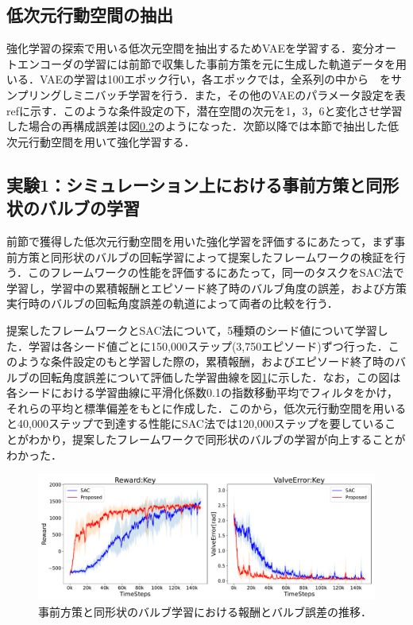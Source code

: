 \documentclass[dvipdfmx]{ampbt_nomag}
\begin{document}
\subsection{低次元行動空間の抽出}
強化学習の探索で用いる低次元空間を抽出するためVAEを学習する．変分オートエンコーダの学習には前節で収集した事前方策を元に生成した軌道データを用いる．VAEの学習は100エポック行い，各エポックでは，全系列の中から　をサンプリングしミニバッチ学習を行う．また，その他のVAEのパラメータ設定を表ref{}に示す．このような条件設定の下，潜在空間の次元を1，3，6と変化させ学習した場合の再構成誤差は図\ref{}のようになった．次節以降では本節で抽出した低次元行動空間を用いて強化学習する．



\subsection{実験1：シミュレーション上における事前方策と同形状のバルブの学習}
前節で獲得した低次元行動空間を用いた強化学習を評価するにあたって，まず事前方策と同形状のバルブの回転学習によって提案したフレームワークの検証を行う．このフレームワークの性能を評価するにあたって，同一のタスクをSAC法で学習し，学習中の累積報酬とエピソード終了時のバルブ角度の誤差，および方策実行時のバルブの回転角度誤差の軌道によって両者の比較を行う．

提案したフレームワークとSAC法について，5種類のシード値について学習した．学習は各シード値ごとに150,000ステップ(3,750エピソード)ずつ行った．このような条件設定のもと学習した際の，累積報酬，およびエピソード終了時のバルブの回転角度誤差について評価した学習曲線を図\ref{LeaningCurve_Valve3_Sim}に示した．なお，この図は各シードにおける学習曲線に平滑化係数0.1の指数移動平均でフィルタをかけ，それらの平均と標準偏差をもとに作成した．このから，低次元行動空間を用いると40,000ステップで到達する性能にSAC法では120,000ステップを要していることがわかり，提案したフレームワークで同形状のバルブの学習が向上することがわかった．
\begin{figure}[htbp]
  \centering
  \includegraphics[width=16cm]
       {asset/img/SimTurn180Valve3.pdf}
  \caption{事前方策と同形状のバルブ学習における報酬とバルブ誤差の推移．}
  \label{LeaningCurve_Valve3_Sim}
\end{figure}
\end{document}
